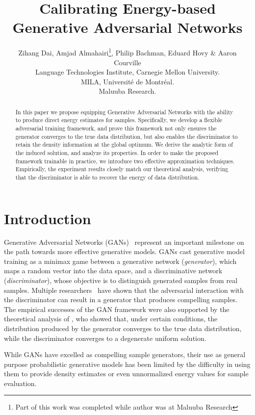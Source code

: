 \documentclass[a4paper]{article}
\title{Calibrating Energy-based Generative Adversarial Networks}
\author{
	Zihang Dai, Amjad Almahairi\thanks{Part of this work was completed while author was at Maluuba Research}, Philip Bachman, Eduard Hovy \& Aaron Courville\\
     Language Technologies Institute, Carnegie Mellon University.\\
     MILA,  Universit\'e de Montr\'eal.\\
     Maluuba Research.
}
\begin{document}
\maketitle
	
\begin{abstract}
In this paper we propose equipping Generative Adversarial Networks with the ability to produce direct energy estimates for samples.
Specifically, we develop a flexible adversarial training framework, and prove this framework not only ensures the generator converges to the true data distribution, but also enables the discriminator to retain the density information at the global optimum.
We derive the analytic form of the induced solution, and analyze its properties.
In order to make the proposed framework trainable in practice, we introduce two effective approximation techniques.
Empirically, the experiment results closely match our theoretical analysis, verifying that the discriminator is able to recover the energy of data distribution.
\end{abstract}

\section{Introduction}
\label{sec:introduction}

Generative Adversarial Networks (GANs)~\citep{goodfellow2014generative} represent an important milestone on the path towards more effective generative models.
GANs cast generative model training as a minimax game between a generative network (\emph{generator}), which maps a random vector into the data space, and a discriminative network (\emph{discriminator}), whose objective is to distinguish generated samples from real samples. Multiple researchers~\cite{radford2015unsupervised,salimans2016improved,zhao2016energy} have shown that the adversarial interaction with the discriminator can result in a generator that produces compelling samples. 
The empirical successes of the GAN framework were also supported by the theoretical analysis of \citeauthor{goodfellow2014generative}, who showed that,
under certain conditions, the distribution produced by the generator converges to the true data distribution, while
the discriminator converges to a degenerate uniform solution.




While GANs have excelled as compelling sample generators, their use as general purpose probabilistic generative models has been limited by the difficulty in using them to provide density estimates or even unnormalized energy values for sample evaluation. 
\end{document}
